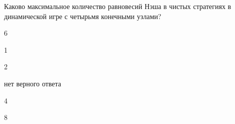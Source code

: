 
\begin{question}
Каково максимальное количество равновесий Нэша в чистых стратегиях в
динамической игре с четырьмя конечными узлами?
\begin{answerlist}
  \item 6
  \item 1
  \item 2
  \item нет верного ответа
  \item 4
  \item 8
\end{answerlist}
\end{question}


